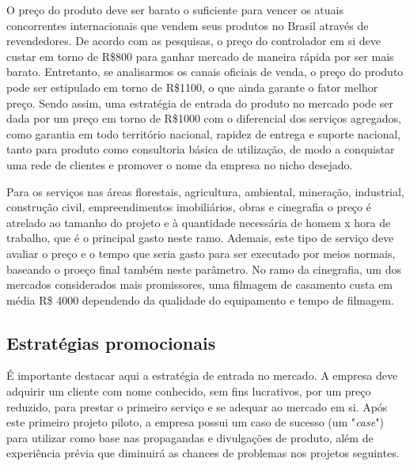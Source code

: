 
O preço do produto deve ser barato o suficiente para vencer os 
atuais concorrentes internacionais que vendem seus produtos no 
Brasil através de revendedores. De acordo com as pesquisas, o 
preço do controlador em si deve custar em torno de R\$800 para 
ganhar mercado de maneira rápida por ser mais barato. Entretanto, 
se analisarmos os canais oficiais de venda, o preço do produto 
pode ser estipulado em torno de R\$1100, o que ainda garante o 
fator melhor preço. Sendo assim, uma estratégia de entrada do 
produto no mercado pode ser dada por um preço em torno de R\$1000 com o 
diferencial dos serviços agregados, como garantia em todo território 
nacional, rapidez de entrega e suporte nacional, tanto para produto 
como consultoria básica de utilização, de modo a conquistar uma 
rede de clientes e promover o nome da empresa no nicho desejado.

Para os serviços nas áreas florestais, agricultura, ambiental, mineração, 
industrial, construção civil, empreendimentos imobiliários, 
obras e cinegrafia o preço é atrelado ao tamanho do projeto e 
à quantidade necessária de homem x hora de trabalho, que é o principal 
gasto neste ramo. Ademais, este tipo de serviço deve avaliar o preço
e o tempo que seria gasto para ser executado por meios normais,
baseando o proeço final também neste parâmetro.
No ramo da cinegrafia, um dos mercados considerados 
mais promissores, uma filmagem de casamento custa em média 
R\$ 4000 dependendo da qualidade do equipamento e tempo de filmagem.

\subsection{Estratégias promocionais}


É importante destacar aqui a estratégia de entrada no mercado. 
A empresa deve adquirir um cliente com nome conhecido, sem fins 
lucrativos, por um preço reduzido, para prestar o primeiro serviço e 
se adequar ao mercado em si. Após este primeiro projeto piloto, a 
empresa possui um caso de sucesso (um "\emph{case}") para utilizar como 
base nas propagandas e divulgações de produto, além de experiência 
prévia que diminuirá as chances de problemas nos projetos seguintes.

